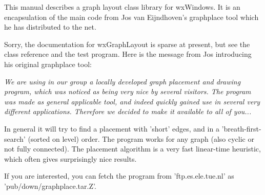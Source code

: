 This manual describes a graph layout class library for wxWindows. It is
an encapsulation of the main code from Jos van Eijndhoven's graphplace
tool which he has distributed to the net.


Sorry, the documentation for wxGraphLayout is sparse at present, but
see the class reference and the test program. Here is the message from Jos
introducing his original graphplace tool:

{\it
We are using in our group a locally developed graph placement and drawing
program, which was noticed as being very nice by several visitors.
The program was made as general applicable tool,
and indeed quickly gained use in several very different applications.
Therefore we decided to make it available to all of you...

In general it will try to find a placement with 'short' edges, and in a
'breath-first-search' (sorted on level) order. The program works for any
graph (also cyclic or not fully connected). The placement algorithm is a
very fast linear-time heuristic, which often gives surprisingly nice
results.

If you are interested, you can fetch the program from 'ftp.es.ele.tue.nl'
as 'pub/down/graphplace.tar.Z'.
}


%

